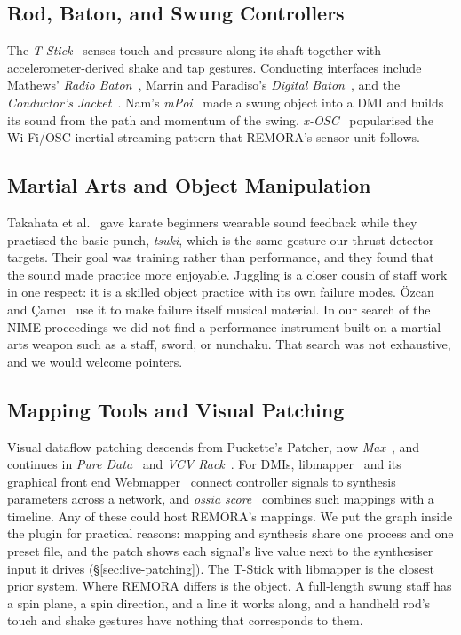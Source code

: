 \documentclass[sigconf,nonacm]{acmart}
\begin{document}
\subsection{Rod, Baton, and Swung Controllers}
The \textit{T-Stick}~\cite{malloch2007tstick} senses touch and pressure along its shaft together
with accelerometer-derived shake and tap gestures. Conducting interfaces include Mathews'
\textit{Radio Baton}~\cite{mathews1991radiobaton}, Marrin and Paradiso's \textit{Digital
Baton}~\cite{marrin1997digitalbaton}, and the \textit{Conductor's
Jacket}~\cite{marrin1998conductorsjacket}. Nam's \textit{mPoi}~\cite{nam2013mpoi} made a swung
object into a DMI and builds its sound from the path and momentum of the swing. \textit{x-OSC}~\cite{madgwick2013xosc}
popularised the Wi-Fi/OSC inertial streaming pattern that REMORA's sensor unit follows.

\subsection{Martial Arts and Object Manipulation}
Takahata et al.~\cite{takahata2004karate} gave karate beginners wearable sound feedback while they
practised the basic punch, \emph{tsuki}, which is the same gesture our thrust detector targets. Their
goal was training rather than performance, and they found that the sound made practice more
enjoyable. Juggling is a closer cousin of staff work in one respect: it is a skilled object
practice with its own failure modes. \"Ozcan and \c{C}amc{\i}~\cite{ozcan2024juggling} use it to
make failure itself musical material. In our search of the NIME proceedings we did not find a
performance instrument built on a martial-arts weapon such as a staff, sword, or nunchaku. That
search was not exhaustive, and we would welcome pointers.

\subsection{Mapping Tools and Visual Patching}
Visual dataflow patching descends from Puckette's Patcher, now
\textit{Max}~\cite{puckette1988patcher,puckette2002maxatseventeen}, and continues in \textit{Pure
Data}~\cite{puckette1996puredata} and \textit{VCV Rack}~\cite{belt2017vcvrack}. For DMIs,
libmapper~\cite{malloch2015libmapper} and its graphical front end
Webmapper~\cite{wang2019webmapper} connect controller signals to synthesis parameters across a
network, and \textit{ossia score}~\cite{celerier2015ossia} combines such mappings with a timeline.
Any of these could host REMORA's mappings. We put the graph inside the plugin for practical
reasons: mapping and synthesis share one process and one preset file, and the patch shows each
signal's live value next to the synthesiser input it drives (\S\ref{sec:live-patching}). The T-Stick
with libmapper is the closest prior system. Where REMORA differs is the object. A full-length swung
staff has a spin plane, a spin direction, and a line it works along, and a handheld rod's touch and
shake gestures have nothing that corresponds to them.
\end{document}
